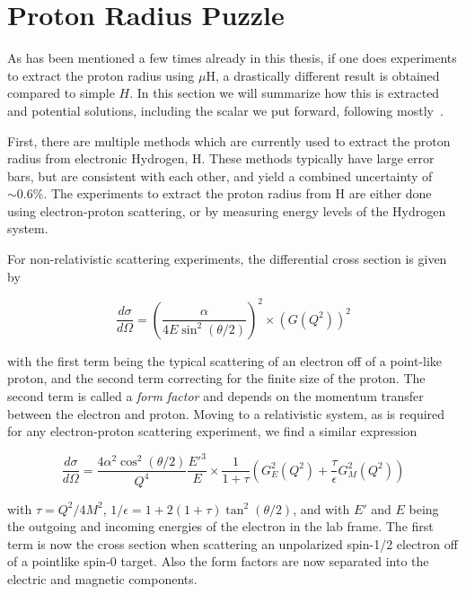 \section{Proton Radius Puzzle}
As has been mentioned a few times already in this thesis, if one does experiments to extract the proton radius using $\mu\textrm{H}$, a drastically different result is obtained compared to simple $H$.
In this section we will summarize how this is extracted and potential solutions, including the scalar we put forward, following mostly~\cite{Carlson:2015jba}.

First, there are multiple methods which are currently used to extract the proton radius from electronic Hydrogen, H.
These methods typically have large error bars, but are consistent with each other, and yield a combined uncertainty of $\sim 0.6\%$.
The experiments to extract the proton radius from H are either done using electron-proton scattering, or by measuring energy levels of the Hydrogen system.

For non-relativistic scattering experiments, the differential cross section is given by

\begin{equation}
    \frac{d\sigma}{d\Omega} = \left(\frac{\alpha}{4E\sin^2(\theta/2)}\right)^2 \times \left(G(Q^2)\right)^2
\end{equation}

\noindent with the first term being the typical scattering of an electron off of a point-like proton, and the second term correcting for the finite size of the proton.
The second term is called a \textit{form factor} and depends on the momentum transfer between the electron and proton.
Moving to a relativistic system, as is required for any electron-proton scattering experiment, we find a similar expression

\begin{equation}
    \frac{d\sigma}{d\Omega} = \frac{4 \alpha^2 \cos^2(\theta/2)}{Q^4} \frac{E'^3}{E} \times \frac{1}{1+\tau}\left(G_E^2(Q^2) + \frac{\tau}{\epsilon}G_M^2(Q^2)\right)
\end{equation}

\noindent with $\tau = Q^2/4M^2$, $1/\epsilon = 1 + 2(1+\tau)\tan^2(\theta/2)$, and with $E'$ and $E$ being the outgoing and incoming energies of the electron in the lab frame.
The first term is now the cross section when scattering an unpolarized spin-1/2 electron off of a pointlike spin-0 target.
Also the form factors are now separated into the electric and magnetic components.

